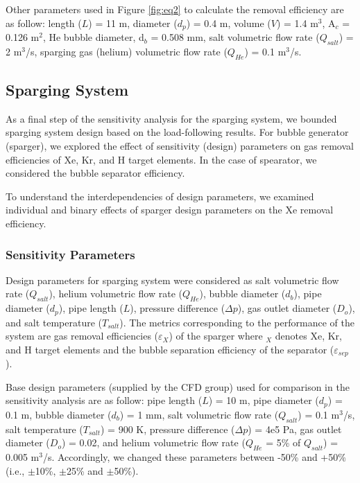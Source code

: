     Other parameters used in Figure \ref{fig:eq2} to calculate the removal 
    efficiency are as follow: length ($L$) = 11 m, diameter ($d_p$) = 0.4 m, 
    volume ($V$) = 1.4 m$^{3}$, A$_c$ = 0.126 m$^{2}$, He bubble diameter, 
    d$_b$ = 0.508 mm, salt volumetric flow rate ($Q_{salt}$) = 2 m$^{3}$/s, 
    sparging gas (helium) volumetric flow rate ($Q_{He}$) = 0.1 m$^{3}$/s.

\subsection{Sparging System}

    As a final step of the sensitivity analysis for the sparging system, we 
    bounded sparging system design based on the load-following results. For 
    bubble generator (sparger), we explored the effect of sensitivity (design) 
    parameters on gas removal efficiencies of Xe, Kr, and H target elements. In 
    the case of spearator, we considered the bubble separator efficiency.

    To understand the interdependencies of design parameters, we examined 
    individual and binary effects of sparger design parameters on the Xe 
    removal efficiency.

\subsubsection{Sensitivity Parameters}

    Design parameters for sparging system were considered as salt volumetric 
    flow rate ($Q_{salt}$), helium volumetric flow rate ($Q_{He}$), bubble 
    diameter ($d_b$), pipe diameter ($d_p$), pipe length ($L$), pressure 
    difference ($\Delta p$), gas outlet diameter ($D_o$), and salt temperature 
    ($T_{salt}$). The metrics corresponding to the performance of the system 
    are gas removal efficiencies ($\varepsilon$$_{X}$) of the sparger where 
    $_{X}$ denotes Xe, Kr, and H target elements and the bubble separation 
    efficiency of the separator ($\varepsilon$$_{sep}$).

    Base design parameters (supplied by the CFD group) used for comparison in 
    the sensitivity analysis are as follow: pipe length ($L$) = 10 m, pipe 
    diameter ($d_p$) = 0.1 m, bubble diameter ($d_b$) = 1 mm, salt volumetric 
    flow rate ($Q_{salt}$) = 0.1 m$^{3}$/s, salt temperature ($T_{salt}$) = 900 
    K, pressure difference ($\Delta p$) = 4e5 Pa, gas outlet diameter ($D_o$) = 
    0.02, and helium volumetric flow rate ($Q_{He}$ = 5\% of $Q_{salt}$) = 
    0.005 m$^{3}$/s. Accordingly, we changed these parameters between -50\% and 
    +50\% (i.e., $\pm$10\%, $\pm$25\% and $\pm$50\%).

